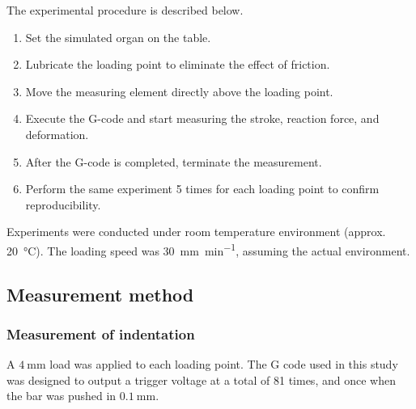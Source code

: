 The experimental procedure is described below.
\begin{enumerate}
    \item Set the simulated organ on the table.
    \item Lubricate the loading point to eliminate the effect of friction.
    \item Move the measuring element directly above the loading point.
    \item Execute the G-code and start measuring the stroke, reaction force, and deformation.
    \item After the G-code is completed, terminate the measurement.
    \item Perform the same experiment 5 times for each loading point to confirm reproducibility.
\end{enumerate}

Experiments were conducted under room temperature environment (approx. \SI{20}{\degreeCelsius}).
The loading speed was \SI[per-mode = symbol]{30}{\milli \m\per \minute}, assuming the actual environment. 

\subsection*{Measurement method}
\subsubsection*{Measurement of indentation}
A $\SI{4}{\milli \m}$ load was applied to each loading point. The G code used in this study was designed to output a trigger voltage at a total of \SI{81}{}
times, and once when the bar was pushed in $\SI{0.1}{\milli \m}$.

